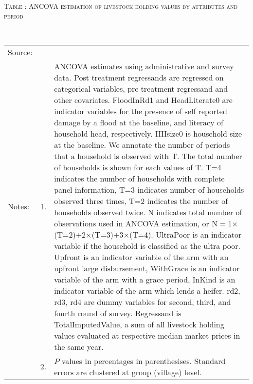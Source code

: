 \hspace{-1cm}\begin{minipage}[t]{14cm}
\hfil\textsc{\normalsize Table \thetable: ANCOVA estimation of livestock holding values by attributes and period\label{tab ANCOVA livestock timevarying attributes}}\\
\setlength{\tabcolsep}{1pt}
\setlength{\baselineskip}{8pt}
\renewcommand{\arraystretch}{.55}
\hfil{}\\
\renewcommand{\arraystretch}{.8}
\setlength{\tabcolsep}{1pt}
\begin{tabular}{>{\hfill\scriptsize}p{1cm}<{}>{\hfill\scriptsize}p{.25cm}<{}>{\scriptsize}p{12cm}<{\hfill}}
Source:& \multicolumn{2}{l}{\scriptsize Estimated with GUK administrative and survey data.}\\
Notes: & 1. & ANCOVA estimates using administrative and survey data. Post treatment regressands are regressed on categorical variables, pre-treatment regressand and other covariates. \textsf{FloodInRd1} and \textsf{HeadLiterate0} are indicator variables for the presence of self reported damage by a flood at the baseline, and literacy of household head, respectively. \textsf{HHsize0} is household size at the baseline. We annotate the number of periods that a household is observed with \textsf{T}. The total number of households is shown for each values of \textsf{T}. \textsf{T=4} indicates the number of households with complete panel information, \textsf{T=3} indicates number of households observed three times, \textsf{T=2} indicates the number of households observed twice. \textsf{N} indicates total number of observations used in ANCOVA estimation, or \textsf{N$=$1$\times$(T=2)+2$\times$(T=3)+3$\times$(T=4)}.  \textsf{UltraPoor} is an indicator variable if the household is classified as the ultra poor. \textsf{Upfront} is an indicator variable of the arm with an upfront large disbursement, \textsf{WithGrace} is an indicator variable of the arm with a grace period, \textsf{InKind} is an indicator variable of the arm which lends a heifer. \textsf{rd2, rd3, rd4} are dummy variables for second, third, and fourth round of survey. Regressand is \textsf{TotalImputedValue}, a sum of all livestock holding values evaluated at respective median market prices in the same year. \\
& 2. & $P$ values in percentages in parenthesises. Standard errors are clustered at group (village) level.
\end{tabular}
\end{minipage}


